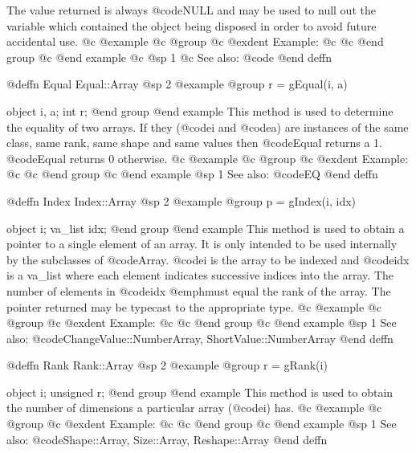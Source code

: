 The value returned is always @code{NULL} and may be used to null out
the variable which contained the object being disposed in order to
avoid future accidental use.
@c @example
@c @group
@c @exdent Example:
@c 
@c @end group
@c @end example
@c @sp 1
@c See also:  @code{}
@end deffn





@deffn {Equal} Equal::Array
@sp 2
@example
@group
r = gEqual(i, a)

object  i, a;
int     r;
@end group
@end example
This method is used to determine the equality of two arrays.  If they
(@code{i} and @code{a}) are instances of the same class, same rank,
same shape and same values then @code{Equal} returns a 1.  @code{Equal}
returns 0 otherwise.
@c @example
@c @group
@c @exdent Example:
@c 
@c @end group
@c @end example
@sp 1
See also:  @code{EQ}
@end deffn








@deffn {Index} Index::Array
@sp 2
@example
@group
p = gIndex(i, idx)

object     i;
va_list  idx;
@end group
@end example
This method is used to obtain a pointer to a single element of an array.
It is only intended to be used internally by the subclasses of
@code{Array}.  @code{i} is the array to be indexed and @code{idx} is a
va_list where each element indicates successive indices into the
array.  The number of elements in @code{idx} @emph{must} equal the rank
of the array.  The pointer returned may be typecast to the appropriate
type.
@c @example
@c @group
@c @exdent Example:
@c 
@c @end group
@c @end example
@sp 1
See also:  @code{ChangeValue::NumberArray, ShortValue::NumberArray}
@end deffn








@deffn {Rank} Rank::Array
@sp 2
@example
@group
r = gRank(i)

object    i;
unsigned  r;
@end group
@end example
This method is used to obtain the number of dimensions a particular
array (@code{i}) has.
@c @example
@c @group
@c @exdent Example:
@c 
@c @end group
@c @end example
@sp 1
See also:  @code{Shape::Array, Size::Array, Reshape::Array}
@end deffn











